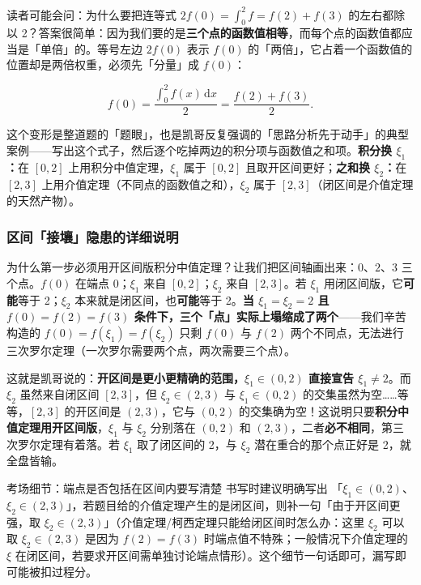 \documentclass[a4paper]{article}
\begin{document}
读者可能会问：为什么要把连等式 $2f(0)=\int_0^2 f=f(2)+f(3)$ 的左右都除以 2？答案很简单：因为我们要的是\textbf{三个点的函数值相等}，而每个点的函数值都应当是「单倍」的。等号左边 $2f(0)$ 表示 $f(0)$ 的「两倍」，它占着一个函数值的位置却是两倍权重，必须先「分量」成 $f(0)$：

\[
f(0)=\frac{\int_0^2 f(x)\,\mathrm{d}x}{2}=\frac{f(2)+f(3)}{2} .
\]

这个变形是整道题的「题眼」，也是凯哥反复强调的「思路分析先于动手」的典型案例——写出这个式子，然后逐个吃掉两边的积分项与函数值之和项。\textbf{积分换 $\xi_1$：}在 $[0,2]$ 上用积分中值定理，$\xi_1$ 属于 $[0,2]$ 且取开区间更好；\textbf{之和换 $\xi_2$：}在 $[2,3]$ 上用介值定理（不同点的函数值之和），$\xi_2$ 属于 $[2,3]$（闭区间是介值定理的天然产物）。

\subsubsection{区间「接壤」隐患的详细说明}

为什么第一步必须用开区间版积分中值定理？让我们把区间轴画出来：$0$、$2$、$3$ 三个点。$f(0)$ 在端点 $0$；$\xi_1$ 来自 $[0,2]$；$\xi_2$ 来自 $[2,3]$。若 $\xi_1$ 用闭区间版，它\textbf{可能}等于 2；$\xi_2$ 本来就是闭区间，也\textbf{可能}等于 2。\textbf{当 $\xi_1=\xi_2=2$ 且 $f(0)=f(2)=f(3)$ 条件下，三个「点」实际上塌缩成了两个}——我们辛苦构造的 $f(0)=f(\xi_1)=f(\xi_2)$ 只剩 $f(0)$ 与 $f(2)$ 两个不同点，无法进行三次罗尔定理（一次罗尔需要两个点，两次需要三个点）。

这就是凯哥说的：\textbf{开区间是更小更精确的范围，$\xi_1\in(0,2)$ 直接宣告 $\xi_1\neq2$}。而 $\xi_2$ 虽然来自闭区间 $[2,3]$，但 $\xi_2\in(2,3)$ 与 $\xi_1\in(0,2)$ 的交集虽然为空……等等，$[2,3]$ 的开区间是 $(2,3)$，它与 $(0,2)$ 的交集确为空！这说明只要\textbf{积分中值定理用开区间版}，$\xi_1$ 与 $\xi_2$ 分别落在 $(0,2)$ 和 $(2,3)$，二者\textbf{必不相同}，第三次罗尔定理有着落。若 $\xi_1$ 取了闭区间的 2，与 $\xi_2$ 潜在重合的那个点正好是 2，就全盘皆输。

\begin{warningbox}{考场细节：端点是否包括在区间内要写清楚}
书写时建议明确写出 「$\xi_1\in(0,2)$、$\xi_2\in(2,3)$」，若题目给的介值定理产生的是闭区间，则补一句「由于开区间更强，取 $\xi_2\in(2,3)$」（介值定理/柯西定理只能给闭区间时怎么办：这里 $\xi_2$ 可以取 $\xi_2\in(2,3)$ 是因为 $f(2)=f(3)$ 时端点值不特殊；一般情况下介值定理的 $\xi$ 在闭区间，若要求开区间需单独讨论端点情形）。这个细节一句话即可，漏写即可能被扣过程分。
\end{warningbox}
\end{document}
